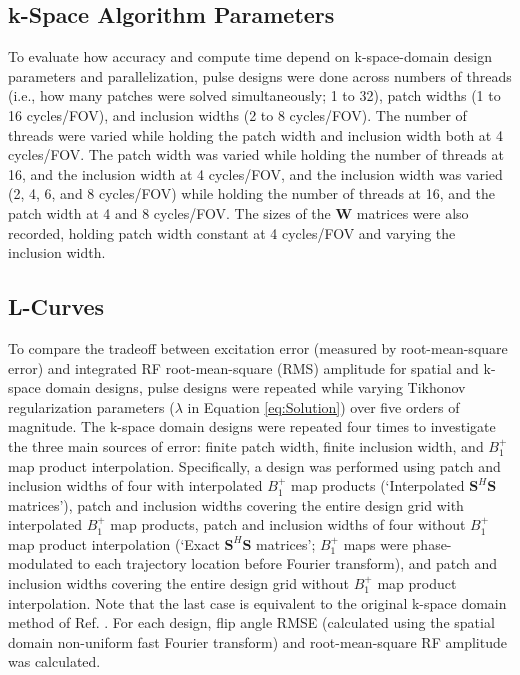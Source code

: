 \subsection*{k-Space Algorithm Parameters}
To evaluate how accuracy and compute time depend on k-space-domain design parameters and parallelization,
pulse designs were done across numbers of threads (i.e., how many patches were solved simultaneously; 1 to 32), 
patch widths (1 to 16 cycles/FOV), and inclusion widths (2 to 8 cycles/FOV). 
The number of threads were varied while holding the patch width and inclusion width both at 4 cycles/FOV.
The patch width was varied while holding the number of threads at 16, and the inclusion width at 4 cycles/FOV,
and the inclusion width was varied (2, 4, 6, and 8 cycles/FOV) while holding the number of threads at 16, and the patch width at 4 and 8 cycles/FOV. 
The sizes of the $\bm{W}$ matrices were also recorded, holding patch width constant at 4 cycles/FOV and varying the inclusion width. 

\subsection*{L-Curves}
To compare the tradeoff between excitation error (measured by root-mean-square error)
and integrated RF root-mean-square (RMS) amplitude for spatial and k-space domain designs,
pulse designs were repeated while varying Tikhonov regularization parameters ($\lambda$ in Equation \ref{eq:Solution}) 
over five orders of magnitude. 
The k-space domain designs were repeated four times to investigate the three main sources of error:
finite patch width, finite inclusion width, and $B_1^+$ map product interpolation. 
Specifically, a design was performed using patch and inclusion widths of four
with interpolated $B_1^+$ map products (`Interpolated $\bm{S}^H\bm{S}$ matrices'),
patch and inclusion widths covering the entire design grid with interpolated $B_1^+$ map products,
patch and inclusion widths of four without $B_1^+$ map product interpolation (`Exact $\bm{S}^H\bm{S}$ matrices'; 
$B_1^+$ maps were phase-modulated to each trajectory location before Fourier transform),
and patch and inclusion widths covering the entire design grid without $B_1^+$ map product interpolation. 
Note that the last case is equivalent to the original k-space domain method of Ref. \cite{Katscher:2003:Magn-Reson-Med:12509830}.
For each design, flip angle RMSE (calculated using the spatial domain non-uniform fast Fourier transform) and root-mean-square RF amplitude was
calculated.

